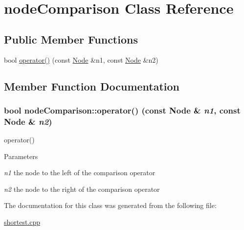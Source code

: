 \hypertarget{classnodeComparison}{
\section{nodeComparison Class Reference}
\label{classnodeComparison}
}
\subsection*{Public Member Functions}
\begin{DoxyCompactItemize}
\item 
bool \hyperlink{classnodeComparison_aa8106ecdc2288216d583f0dd0c532990}{operator()} (const \hyperlink{structNode}{Node} \&n1, const \hyperlink{structNode}{Node} \&n2)
\end{DoxyCompactItemize}


\subsection{Member Function Documentation}
\hypertarget{classnodeComparison_aa8106ecdc2288216d583f0dd0c532990}{
\subsubsection[{operator()}]{\setlength{\rightskip}{0pt plus 5cm}bool nodeComparison::operator() (const {\bf Node} \& {\em n1}, \/  const {\bf Node} \& {\em n2})}}
\label{classnodeComparison_aa8106ecdc2288216d583f0dd0c532990}
operator() 
\begin{DoxyParams}{Parameters}
\item[{\em n1}]the node to the left of the comparison operator \item[{\em n2}]the node to the right of the comparison operator \end{DoxyParams}


The documentation for this class was generated from the following file:\begin{DoxyCompactItemize}
\item 
\hyperlink{shortest_8cpp}{shortest.cpp}\end{DoxyCompactItemize}
